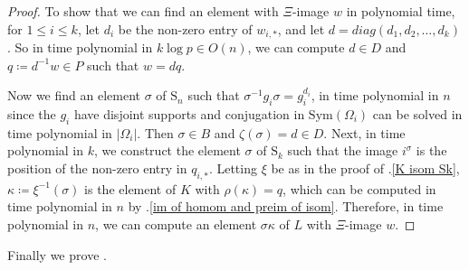 \documentclass[11pt,a4paper]{article}
\theoremstyle{definition}
\theoremstyle{remark}
\newcommand{\Sym}[0]{\mathrm{Sym}}
\newcommand{\Sy}{\mathrm{S}}
\begin{document}
\begin{proof}
To show that we can find an element with $\Xi$-image $w$ in polynomial time, for $1 \leq i \leq k$, let $d_i$ be the non-zero entry of $w_{i,*}$, and let $d = diag(d_1, d_2, \ldots, d_k)$. So in time polynomial in $k\log{p} \in O(n)$, we can compute $d \in D$ and $q \coloneqq  d^{-1} w \in P$ such that $w= d q$.

Now we find an element $\sigma$ of $\Sy_n$ such that $\sigma^{-1}g_i\sigma = g_i^{d_i}$, in time polynomial in $n$ since the $g_i$ have disjoint supports and conjugation in $\Sym(\Omega_i)$ can be solved in time polynomial in $|\Omega_i|$. Then $\sigma \in B$ and $\zeta(\sigma) = d \in D$.
Next, in time polynomial in $k$, we construct the element $\sigma$ of $\Sy_k$ such that the image $i^\sigma$ is the position of the non-zero entry in $q_{i,*}$. 
Letting $\xi$ be as in the proof of .\ref{K isom Sk}, $\kappa \coloneqq \xi^{-1}(\sigma)$ is the element of $K$ with $\rho(\kappa) = q$, which can be computed in time polynomial in $n$ by .\ref{im of homom and preim of isom}. Therefore, in time polynomial in $n$, we can compute an element $\sigma \kappa$ of $L$ with $\Xi$-image $w$. 
\end{proof}

Finally we prove . 
\end{document}
